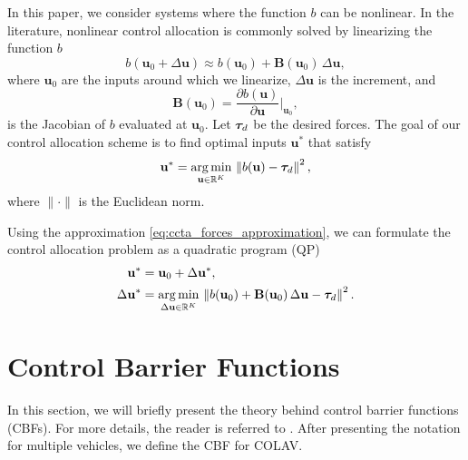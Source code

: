 In this paper, we consider systems where the function $b$ can be nonlinear.
In the literature, nonlinear control allocation is commonly solved by linearizing the function $b$ \cite{harkegard_dynamic_2004,johansen_constrained_2004}%
\begin{equation}
    b(\mathbf{u}_0 + \Delta\mathbf{u}) \approx b(\mathbf{u}_0) + \mathbf{B}(\mathbf{u}_0)\,\Delta\mathbf{u},
    \label{eq:ccta_forces_approximation}
\end{equation}
where $\mathbf{u}_0$ are the inputs around which we linearize, $\Delta\mathbf{u}$ is the increment, and
\begin{equation}
    \mathbf{B}(\mathbf{u}_0) = \frac{\partial b(\mathbf{u})}{\partial \mathbf{u}}\bigg|_{\mathbf{u}_0},
\end{equation}
is the Jacobian of $b$ evaluated at $\mathbf{u}_0$.
Let $\bm{\tau}_d$ be the desired forces.
The goal of our control allocation scheme is to find optimal inputs $\mathbf{u}^*$ that satisfy
\begin{equation}
    \mathbf{u}^* = \operatorname*{arg\,min}_{\mathbf{u}\in\mathbb{R}^{K}}\,\left\| b(\mathbf{u}) - \bm{\tau}_d \right\|^2,
\end{equation}
where $\|\cdot\|$ is the Euclidean norm.

Using the approximation \eqref{eq:ccta_forces_approximation}, we can formulate the control allocation problem as a quadratic program (QP) 
\begin{align}
    \mathbf{u}^* &= \mathbf{u}_0 + \Delta\mathbf{u}^*, \\
    \Delta\mathbf{u}^* &= \operatorname*{arg\,min}_{\Delta\mathbf{u}\in\mathbb{R}^{K}}\,\left\| b(\mathbf{u}_{0}) + \mathbf{B}(\mathbf{u}_{0})\,\Delta\mathbf{u} - \bm{\tau}_{d} \right\|^2.
\end{align} 

\section{Control Barrier Functions}
\label{sec:ccta_CBF}
In this section, we will briefly present the theory behind control barrier functions (CBFs).
For more details, the reader is referred to \cite{ames_control_2019}.
After presenting the notation for multiple vehicles, we define the CBF for COLAV.

